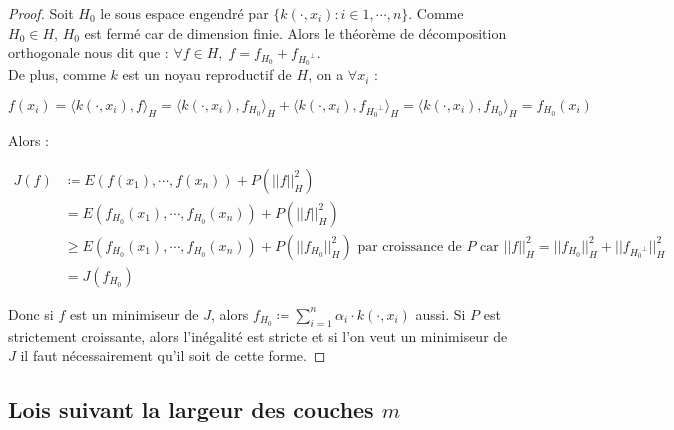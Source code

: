 \documentclass[a4paper, 11pt, french]{article}
\theoremstyle{definition}
\begin{document}
\begin{proof}
	Soit $H_0$ le sous espace engendré par $\{k(\cdot, x_i ) : i \in 1, \cdots, n\}$. Comme $H_0 \in H$, $H_0$ est fermé car de dimension finie. Alors le théorème de décomposition orthogonale nous dit que : $\forall f \in H, \; f = f_{H_0} + f_{{H_0}^\perp}$. \\
	
	De plus, comme $k$ est un noyau reproductif de $H$, on a $\forall x_i$ :
	
	\[f(x_i) = \langle k(\cdot, x_i), f \rangle_H = \langle k(\cdot, x_i), f_{H_0} \rangle_H + \langle k(\cdot, x_i), f_{{H_0}^\perp} \rangle_H = \langle k(\cdot, x_i), f_{H_0} \rangle_H = f_{H_0} (x_i) \]
	
	Alors :
	
	\begin{align*}
		J(f) &\coloneqq E(f(x_1), \cdots, f(x_n)) + P(||f||_H^2) \\
		&= E(f_{H_0}(x_1), \cdots, f_{H_0}(x_n)) + P(||f||_H^2) \\
		&\geq E(f_{H_0}(x_1), \cdots, f_{H_0}(x_n)) + P(||f_{H_0}||_H^2) \text{ par croissance de $P$ car $||f||_H^2 = ||f_{H_0}||_H^2 + ||f_{{H_0}^\perp}||_H^2$}\\
		&= J(f_{H_0})
	\end{align*}
	
	Donc si $f$ est un minimiseur de $J$, alors $f_{H_0} \coloneqq \sum_{i=1}^{n} \alpha_i \cdot k(\cdot, x_i)$ aussi. Si $P$ est strictement croissante, alors l'inégalité est stricte et si l'on veut un minimiseur de $J$ il faut nécessairement qu'il soit de cette forme.
\end{proof}

\subsection{Lois suivant la largeur des couches $m$}
\end{document}
